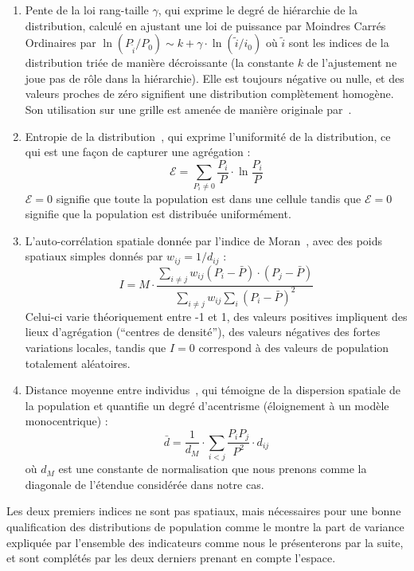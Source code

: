 {\begin{enumerate}
\item Pente de la loi rang-taille $\gamma$, qui exprime le degré de hiérarchie de la distribution, calculé en ajustant une loi de puissance par Moindres Carrés Ordinaires par $\ln \left( P_{\tilde{i}}/P_0\right) \sim k + \gamma\cdot \ln \left(\tilde{i}/i_0\right)$ où $\tilde{i}$ sont les indices de la distribution triée de manière décroissante (la constante $k$ de l'ajustement ne joue pas de rôle dans la hiérarchie). Elle est toujours négative ou nulle, et des valeurs proches de zéro signifient une distribution complètement homogène. Son utilisation sur une grille est amenée de manière originale par~\cite{le2015forme}.
\item Entropie de la distribution~\cite{le2015forme}, qui exprime l'uniformité de la distribution, ce qui est une façon de capturer une agrégation :
\begin{equation}
\mathcal{E} = \sum_{P_i\neq 0}\frac{P_i}{P}\cdot \ln{\frac{P_i}{P}}
\end{equation}
$\mathcal{E}=0$ signifie que toute la population est dans une cellule tandis que $\mathcal{E}=0$ signifie que la population est distribuée uniformément.
\item L'auto-corrélation spatiale donnée par l'indice de Moran~\cite{tsai2005quantifying}, avec des poids spatiaux simples donnés par $w_{ij} = 1/d_{ij}$ :
\[
I = M \cdot \frac{\sum_{i\neq j} w_{ij} \left(P_i - \bar{P}\right)\cdot\left(P_j - \bar{P}\right)}{\sum_{i\neq j} w_{ij} \sum_{i}{\left( P_i - \bar{P}\right)}^2}
\]
Celui-ci varie théoriquement entre -1 et 1, des valeurs positives impliquent des lieux d'agrégation (``centres de densité''), des valeurs négatives des fortes variations locales, tandis que $I=0$ correspond à des valeurs de population totalement aléatoires.
\item Distance moyenne entre individus~\cite{le2009quantifier}, qui témoigne de la dispersion spatiale de la population et quantifie un degré d'acentrisme (éloignement à un modèle monocentrique) :
\[
\bar{d} = \frac{1}{d_M}\cdot \sum_{i<j} \frac{P_i P_j}{P^2} \cdot d_{ij}
\]
où $d_M$ est une constante de normalisation que nous prenons comme la diagonale de l'étendue considérée dans notre cas.
\end{enumerate}
}


Les deux premiers indices ne sont pas spatiaux, mais nécessaires pour une bonne qualification des distributions de population comme le montre la part de variance expliquée par l'ensemble des indicateurs comme nous le présenterons par la suite, et sont complétés par les deux derniers prenant en compte l'espace.


